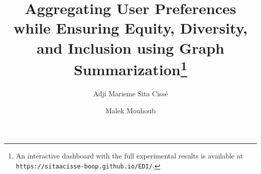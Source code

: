 \documentclass[runningheads]{llncs}
\begin{document}
%
\title{Aggregating User Preferences while Ensuring Equity, Diversity, and Inclusion using Graph Summarization\thanks{An interactive dashboard with the full experimental results is available at \texttt{https://sitaacisse-boop.github.io/EDI/}.}}

%
%
\author{Adji Marieme Sita Cissé \and Malek Mouhoub }
%
%
\end{document}
